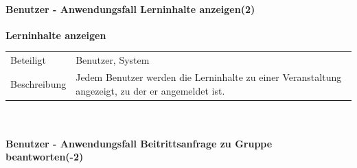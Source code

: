 \documentclass[12pt,a4paper]{article}
\begin{document}
\paragraph{Benutzer - Anwendungsfall \glqq Lerninhalte anzeigen\grqq  (2)}\mbox{}

\textbf{Lerninhalte anzeigen}\\
\begin{tabular}{l|p{12cm}}
	\hline 
	Beteiligt & Benutzer, System  \\ 
	Beschreibung & Jedem Benutzer werden die Lerninhalte zu einer Veranstaltung angezeigt, zu der er angemeldet ist. \\ 
\end{tabular}\\


\paragraph{Benutzer - Anwendungsfall \glqq Beitrittsanfrage zu Gruppe beantworten\grqq (-2)}\mbox{}
\end{document}
